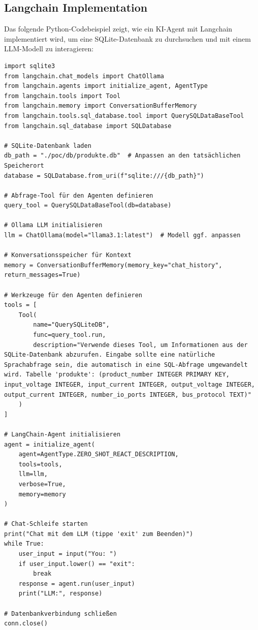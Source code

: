 \subsection{Langchain Implementation}
\label{sec:langchain-implementation}

Das folgende Python-Codebeispiel zeigt, wie ein KI-Agent mit Langchain implementiert wird, um eine SQLite-Datenbank zu durchsuchen und mit einem LLM-Modell zu interagieren:

\begin{lstlisting}[style=pythonstyle, caption={Langchain Implementation des KI-Agenten}]
import sqlite3
from langchain.chat_models import ChatOllama
from langchain.agents import initialize_agent, AgentType
from langchain.tools import Tool
from langchain.memory import ConversationBufferMemory
from langchain.tools.sql_database.tool import QuerySQLDataBaseTool
from langchain.sql_database import SQLDatabase

# SQLite-Datenbank laden
db_path = "./poc/db/produkte.db"  # Anpassen an den tatsächlichen Speicherort
database = SQLDatabase.from_uri(f"sqlite:///{db_path}")

# Abfrage-Tool für den Agenten definieren
query_tool = QuerySQLDataBaseTool(db=database)

# Ollama LLM initialisieren
llm = ChatOllama(model="llama3.1:latest")  # Modell ggf. anpassen

# Konversationsspeicher für Kontext
memory = ConversationBufferMemory(memory_key="chat_history", return_messages=True)

# Werkzeuge für den Agenten definieren
tools = [
    Tool(
        name="QuerySQLiteDB",
        func=query_tool.run,
        description="Verwende dieses Tool, um Informationen aus der SQLite-Datenbank abzurufen. Eingabe sollte eine natürliche Sprachabfrage sein, die automatisch in eine SQL-Abfrage umgewandelt wird. Tabelle 'produkte': (product_number INTEGER PRIMARY KEY, input_voltage INTEGER, input_current INTEGER, output_voltage INTEGER, output_current INTEGER, number_io_ports INTEGER, bus_protocol TEXT)"
    )
]

# LangChain-Agent initialisieren
agent = initialize_agent(
    agent=AgentType.ZERO_SHOT_REACT_DESCRIPTION,
    tools=tools,
    llm=llm,
    verbose=True,
    memory=memory
)

# Chat-Schleife starten
print("Chat mit dem LLM (tippe 'exit' zum Beenden)")
while True:
    user_input = input("You: ")
    if user_input.lower() == "exit":
        break
    response = agent.run(user_input)
    print("LLM:", response)

# Datenbankverbindung schließen
conn.close()
\end{lstlisting}

